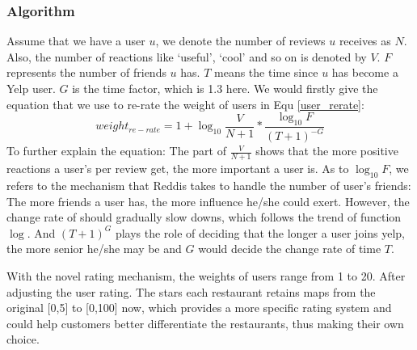 \documentclass{stylefiles/capstone}
\begin{document}
\subsubsection{\textbf{Algorithm}}
Assume that we have a user $u$, we denote the number of reviews $u$ receives as $N$. Also, the number of reactions like `useful', `cool' and so on is denoted by $V$. $F$ represents the number of friends $u$ has. $T$ means the time since $u$ has become a Yelp user. $G$ is the time factor, which is 1.3 here. We would firstly give the equation that we use to re-rate the weight of users in Equ \ref{user_rerate}:
\begin{equation}
weight_{re-rate}=1+\log_{10}{\frac{V}{N+1}*\frac{\log_{10}F}{(T+1)^{-G}}}
\label{user_rerate}
\end{equation}
To further explain the equation: The part of $\frac{V}{N+1}$ shows that the more positive reactions a user’s per review get, the more important a user is. As to $\log_{10}F$, we refers to the mechanism that Reddis takes \cite{redditref} to handle the number of user's friends: The more friends a user has, the more influence he/she could exert. However, the change rate of should gradually slow downs, which follows the  trend of function $\log$. And $(T+1)^G$ plays the role of deciding that the longer a user joins yelp, the more senior he/she may be and $G$ would decide the change rate of time $T$. 

With the novel rating mechanism, the weights of users range from 1 to 20. After adjusting the user rating. The stars each restaurant retains maps from the original [0,5] to [0,100] now, which provides a more specific rating system and could help customers better differentiate the restaurants, thus making their own choice.
\end{document}
